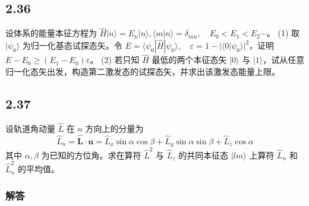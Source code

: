 \subsection{2.36}
设体系的能量本征方程为 $\hat{H} | n \rangle = E_n | n \rangle, \langle m | n \rangle = \delta_{mn}, \quad E_0 < E_1 < E_2 \cdots$。
(1) 取 $| \psi_0 \rangle$ 为归一化基态试探态矢。令 $E = \langle \psi_0 | \hat{H} | \psi_0 \rangle, \quad \varepsilon = 1 - | \langle 0 | \psi_0 \rangle |^2$，证明 $E - E_0 \geqslant  (E_1 - E_0) \varepsilon$。
(2) 若只知 $\hat{H}$ 最低的两个本征态矢 $| 0 \rangle$ 与 $| 1 \rangle$，试从任意归一化态矢出发，构造第二激发态的试探态矢，并求出该激发态能量上限。

\newpage
\subsection{2.37}
设轨道角动量 $\hat{L}$ 在 $n$ 方向上的分量为
$$\hat{L}_n=\hat{\boldsymbol{L}}\cdot \boldsymbol{n}=\hat{L}_x\sin \alpha \cos \beta +\hat{L}_y\sin \alpha \sin \beta +\hat{L}_z\cos \alpha $$
其中 $\alpha, \beta$ 为已知的方位角。求在算符 $\hat{L}^2$ 与 $\hat{L}_z$ 的共同本征态 $| lm \rangle$ 上算符 $\hat{L}_n$ 和 $\hat{L}_n^2$ 的平均值。

\subsubsection{解答}


